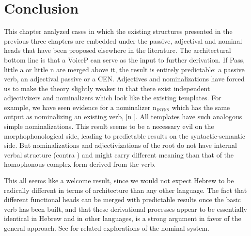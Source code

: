\section{Conclusion} \label{passn:conc}
This chapter analyzed cases in which the existing structures presented in the previous three chapters are embedded under the passive, adjectival and nominal heads that have been proposed elsewhere in the literature. The architectural bottom line is that a VoiceP can serve as the input to further derivation. If Pass, little a or little n are merged above it, the result is entirely predictable: a passive verb, an adjectival passive or a CEN. Adjectives and nominalizations have forced us to make the theory slightly weaker in that there exist independent adjectivizers and nominalizers which look like the existing templates. For example, we have seen evidence for a nominalizer n$_{\gsc{INTNS}}$ which has the same output as nominalizing an existing verb, [n \tpie]. All templates have such analogous simple nominalizations. This result seems to be a necessary evil on the morphophonological side, leading to predictable results on the syntactic-semantic side. But nominalizations and adjectivizations of the root do not have internal verbal structure (contra \citealt{borer13oup,borer14lingua}) and might carry different meaning than that of the homophonous complex form derived from the verb.

This all seems like a welcome result, since we would not expect Hebrew to be radically different in terms of architecture than any other language. The fact that different functional heads can be merged with predictable results once the basic verb has been built, and that these derivational processes appear to be essentially identical in Hebrew and in other languages, is a strong argument in favor of the general approach.  See \citealt{ahdout19phd} for related explorations of the nominal system.\label{r1:5:7}

